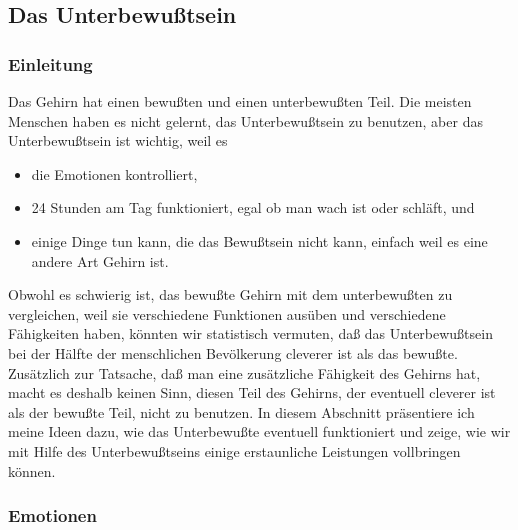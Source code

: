 
\subsection{Das Unterbewußtsein}
\label{c3_6}

\subsubsection{Einleitung}
\label{c3_6a}

Das Gehirn hat einen bewußten und einen unterbewußten Teil.
Die meisten Menschen haben es nicht gelernt, das Unterbewußtsein zu benutzen, aber das Unterbewußtsein ist wichtig, weil es

\begin{itemize} 
 \item die Emotionen kontrolliert,
 \item 24 Stunden am Tag funktioniert, egal ob man wach ist oder schläft, und
 \item einige Dinge tun kann, die das Bewußtsein nicht kann, einfach weil es eine andere Art Gehirn ist.
 \end{itemize}
Obwohl es schwierig ist, das bewußte Gehirn mit dem unterbewußten zu vergleichen, weil sie verschiedene Funktionen ausüben und verschiedene Fähigkeiten haben, könnten wir statistisch vermuten, daß das Unterbewußtsein bei der Hälfte der menschlichen Bevölkerung cleverer ist als das bewußte.
Zusätzlich zur Tatsache, daß man eine zusätzliche Fähigkeit des Gehirns hat, macht es deshalb keinen Sinn, diesen Teil des Gehirns, der eventuell cleverer ist als der bewußte Teil, nicht zu benutzen.
In diesem Abschnitt präsentiere ich meine Ideen dazu, wie das Unterbewußte eventuell funktioniert und zeige, wie wir mit Hilfe des Unterbewußtseins einige erstaunliche Leistungen vollbringen können.


\subsubsection{Emotionen}
\label{c3_6b}

